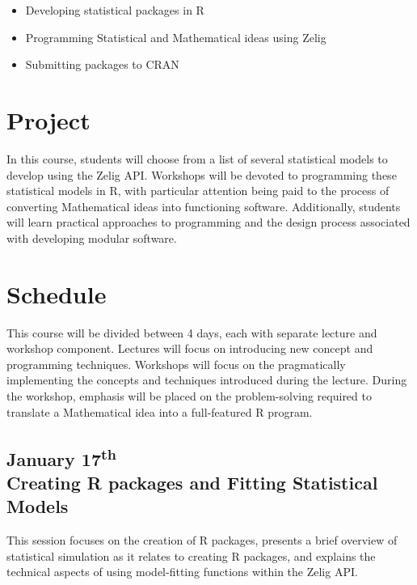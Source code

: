 \documentclass{article}
\begin{document}
\begin{itemize}
  \item Developing statistical packages in R
  \item Programming Statistical and Mathematical ideas using Zelig
  \item Submitting packages to CRAN
\end{itemize}



\section{Project}
\label{project}

In this course, students will choose from a list of several statistical models
to develop using the Zelig API. Workshops will be devoted to programming these
statistical models in R, with particular attention being paid to the process
of converting Mathematical ideas into functioning software. Additionally, 
students will learn practical approaches to programming and the design process
associated with developing modular software.



\section{Schedule}
\label{schedule}

This course will be divided between 4 days, each with separate lecture and
workshop component. Lectures will focus on introducing new concept and
programming techniques. Workshops will focus on the pragmatically implementing
the concepts and techniques introduced during the lecture. During the workshop,
emphasis will be placed on the problem-solving required to translate a
Mathematical idea into a full-featured R program.



\subsection{January 17\textsuperscript{th} \\ Creating R packages and Fitting 
Statistical Models}
  
This session focuses on the creation of R packages, presents a brief overview of
statistical simulation as it relates to creating R packages, and explains the
technical aspects of using model-fitting functions within the Zelig API.
  
\end{document}
